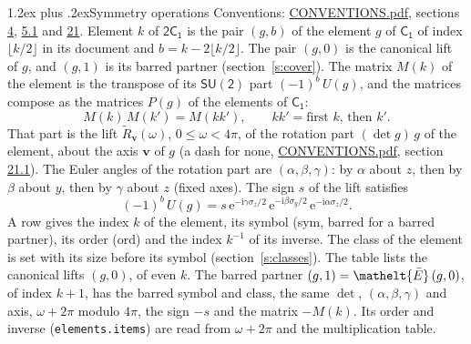 \documentclass[10pt,a4paper]{article}
\makeatletter
\renewcommand\section{\@startsection{section}{1}{\z@}{-3ex plus -1ex minus -.2ex}%
  {1.2ex plus .2ex}{\normalfont\large\sffamily\bfseries\color{parttitle}}}
\numberwithin{equation}{section}
\newcommand{\eltfont}[1]{{\let\sigma\eltsigma\mathelt{#1}}}
\newcommand{\grp}[1]{\mathsf{#1}}
\newcommand{\elt}[1]{\eltfont{#1}}
\newcommand{\vv}{\mathbf{v}}
\newcommand{\iunit}{\mathrm{i}}
\newcommand{\expe}{\mathrm{e}}
\newcommand{\barred}[1]{\bar{#1}}
\newcommand{\lift}[1]{\tilde{#1}}
\newcommand{\pauli}[1]{\sigma_{#1}}
\makeatother
\begin{document}
\section{Symmetry operations}\label{s:elements}
Conventions: \href{../../CONVENTIONS.pdf}{CONVENTIONS.pdf}, sections \href{../../../rotation/CONVENTIONS.pdf\#conv.4}{4}, \href{../../../rotation/CONVENTIONS.pdf\#conv.5.1}{5.1} and \href{../../CONVENTIONS.pdf\#conv.21}{21}.
\leavevmode\label{n:index.element}\label{n:element.g}Element $k$ of $\grp{2C_{1}}$ is the pair $(g, b)$ of the element $g$ of \href{../../../rotation/data/pdf/C1.pdf}{$\grp{C_{1}}$} of index $\lfloor k/2\rfloor$ in its document and $b = k - 2\lfloor k/2\rfloor$. The pair $(g, 0)$ is the canonical lift of $g$, and $(g, 1)$ is its barred partner (section~\ref{s:cover}). \label{n:matrix.element.pin}\label{n:matrix.element}The matrix $M(k)$ of the element is the transpose of its $\grp{SU(2)}$ part $(-1)^{b}\,U(g)$, and the matrices compose as the matrices $P(g)$ of the elements of $\grp{C_{1}}$:
\begin{equation}\label{e:mprod}M(k)\,M(k') = M(kk'),\qquad kk' = \text{first } k\text{, then } k'.\end{equation}
\leavevmode\label{n:angle.omega}\label{n:vector.axis}That part is the lift $\lift{R}_{\vv}(\omega)$, $0 \le \omega < 4\pi$, of the rotation part $(\det g)\,g$ of the element, about the axis $\vv$ of $g$ (a dash for none, \href{../../CONVENTIONS.pdf}{CONVENTIONS.pdf}, section \href{../../CONVENTIONS.pdf\#conv.21.1}{21.1}). \label{n:angle.euler.alpha}\label{n:angle.euler.beta}\label{n:angle.euler.gamma}\label{n:vector.coordinates}The Euler angles of the rotation part are $(\alpha,\beta,\gamma)$: by $\alpha$ about $z$, then by $\beta$ about $y$, then by $\gamma$ about $z$ (fixed axes). \label{n:local.euler.sign}The sign $s$ of the lift satisfies
\begin{equation}\label{e:euler}(-1)^{b}\,U(g) = s\,\expe^{-\iunit\gamma\pauli{z}/2}\,\expe^{-\iunit\beta\pauli{y}/2}\,\expe^{-\iunit\alpha\pauli{z}/2}.\end{equation}
\leavevmode\label{n:index.element.inverse}\label{n:head.sym}\label{n:head.ord}A row gives the index $k$ of the element, its symbol (sym, barred for a barred partner), its order (ord) and the index $k^{-1}$ of its inverse. \label{n:head.class}The class of the element is set with its size before its symbol (section~\ref{s:classes}).
The table lists the canonical lifts $(g, 0)$, of even $k$. The barred partner $(g, 1) = \elt{\barred{E}}\,(g, 0)$, of index $k + 1$, has the barred symbol and class, the same $\det$, $(\alpha,\beta,\gamma)$ and axis, $\omega + 2\pi$ modulo $4\pi$, the sign $-s$ and the matrix $-M(k)$. Its order and inverse (\texttt{elements.items}) are read from $\omega + 2\pi$ and the multiplication table.
\end{document}
